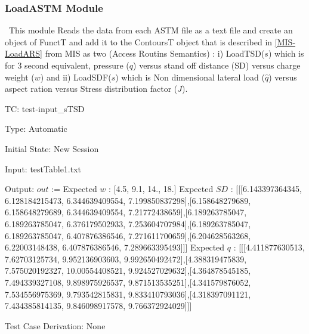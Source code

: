 \documentclass[12pt]{article}
\newcounter{utestnum} %
\begin{document}
\subsubsection{LoadASTM Module}	
	
~\newline This module Reads  the data from each ASTM file as a text file and create an object of
FunctT and add it to the ContoursT object that is described in \ref{MIS-LoadARS}
from MIS as two (Access Routins Semantics) : i) LoadTSD($s$) which is for 3
second equivalent, pressure ($q$) versus stand off distance (SD) versus charge
weight ($w$) and ii) LoadSDF($s$) which is Non dimensional lateral load
($\hat q$) versus aspect ration versus Stress distribution factor ($J$).

\noindent \newline TC\theutestnum: \label{TC_TSD}
test-input\_sTSD

Type: Automatic

Initial State: New Session

Input: testTable1.txt 

Output: $out$ := 
\noindent \newline Expected $w$ : [4.5, 9.1, 14., 18.] \newline
\noindent \newline Expected $SD$ : [[[6.143397364345, 6.128184215473, 6.344639409554, 7.199850837298],[6.158648279689, 6.158648279689, 6.344639409554, 7.21772438659],[6.189263785047, 6.189263785047, 6.376179502933, 7.253604707984],[6.189263785047, 6.189263785047, 6.407876386546, 7.271611700659],[6.204628563268, 6.22003148438, 6.407876386546, 7.289663395493]]] \newline
\noindent \newline Expected $q$ : [[[4.411877630513, 7.62703125734, 9.952136903603, 9.992650492472],[4.388319475839, 7.575020192327, 10.00554408521, 9.924527029632],[4.364878545185, 7.494339327108, 9.898975926537, 9.871513535251],[4.341579876052, 7.534556975369, 9.793542815831, 9.833410793036],[4.318397091121, 7.434385814135, 9.846098917578, 9.766372924029]]] \newline

\noindent \newline Test Case Derivation: None 
\end{document}
